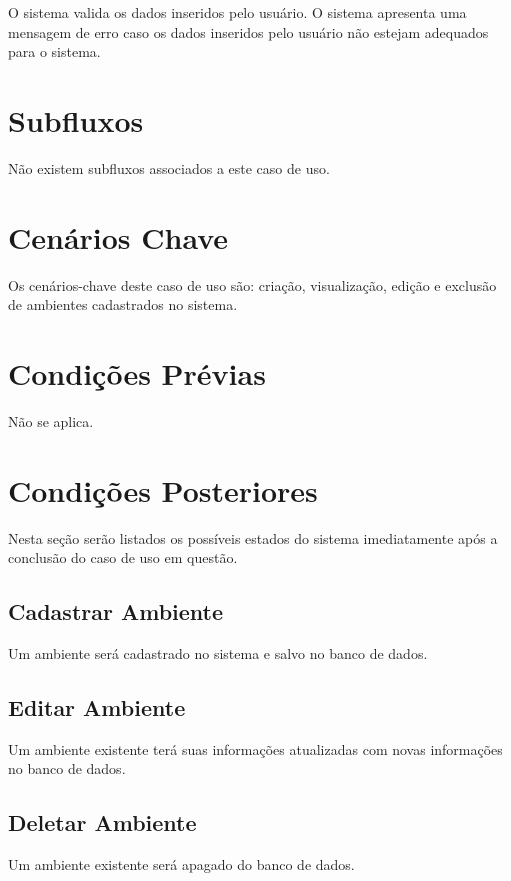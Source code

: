 \documentclass[12pt,a4paper]{article}
\begin{document}
O sistema valida os dados inseridos pelo usuário. O sistema apresenta uma
mensagem de erro caso os dados inseridos pelo usuário não estejam adequados
para o sistema.

\section{Subfluxos}

Não existem subfluxos associados a este caso de uso.

\section{Cenários Chave}

Os cenários-chave deste caso de uso são: criação, visualização, edição e
exclusão de ambientes cadastrados no sistema.

\section{Condições Prévias}

Não se aplica.

\section{Condições Posteriores}

Nesta seção serão listados os possíveis estados do sistema imediatamente após
a conclusão do caso de uso em questão.

\subsection{Cadastrar Ambiente}

Um ambiente será cadastrado no sistema e salvo no banco de dados.

\subsection{Editar Ambiente}

Um ambiente existente terá suas informações atualizadas com novas informações
no banco de dados.

\subsection{Deletar Ambiente}

Um ambiente existente será apagado do banco de dados.
\end{document}
